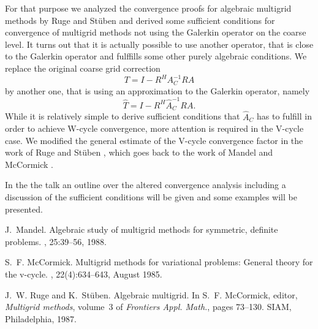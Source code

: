 \documentclass{report}
\begin{document}
For that purpose we analyzed the convergence proofs for algebraic
multigrid methods by Ruge and St\"uben and derived some sufficient
conditions for convergence of multigrid methods not using the Galerkin
operator on the coarse level. It turns out that it is actually possible
to use another operator, that is close to the Galerkin operator and
fulffills some other purely algebraic conditions. We replace the original
coarse grid correction
\begin{equation*}
T = I - R^{H} A_{C}^{-1} R A
\end{equation*}
by another one, that is using an approximation to the Galerkin operator, namely
\begin{equation*}
\hat{T} = I - R^{H} \hat{A}_{C}^{-1} R A.
\end{equation*}
While it is relatively simple to derive sufficient conditions that
$\hat{A}_{C}$ has to fulfill in order to achieve W-cycle convergence,
more attention is required in the V-cycle case. We modified the general
estimate of the V-cycle convergence factor in the work of Ruge and
St\"uben \cite{inc:RUGE87}, which goes back to the work of Mandel
\cite{art:MAND88} and McCormick \cite{art:MCCO85}.

In the the talk an outline over the altered convergence analysis
including a discussion of the sufficient conditions will be given and
some examples will be presented.

\begin{thebibliography}{9}

J.~Mandel.
\newblock Algebraic study of multigrid methods for symmetric, definite
problems.
, 25:39--56, 1988.

S.~F. McCormick.
\newblock Multigrid methods for variational problems: General theory for the
v-cycle.
, 22(4):634--643, August 1985.

J.~W. Ruge and K.~St{\"u}ben.
\newblock Algebraic multigrid.
\newblock In S.~F. McCormick, editor, {\em Multigrid methods}, volume~3 of {\em
Frontiers Appl. Math.}, pages 73--130. SIAM, Philadelphia, 1987.

\end{thebibliography}
\end{document}
